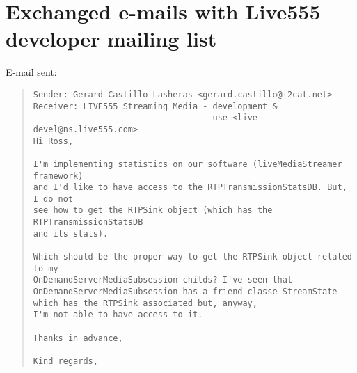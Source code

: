 \chapter{Exchanged e-mails with Live555 developer mailing list}\label{emailRoss}

E-mail sent:

\begin{quote}
\begin{verbatim}
Sender: Gerard Castillo Lasheras <gerard.castillo@i2cat.net>
Receiver: LIVE555 Streaming Media - development & 
									use <live-devel@ns.live555.com> 
Hi Ross,

I'm implementing statistics on our software (liveMediaStreamer framework) 
and I'd like to have access to the RTPTransmissionStatsDB. But, I do not
see how to get the RTPSink object (which has the RTPTransmissionStatsDB 
and its stats).

Which should be the proper way to get the RTPSink object related to my
OnDemandServerMediaSubsession childs? I've seen that 
OnDemandServerMediaSubsession has a friend classe StreamState 
which has the RTPSink associated but, anyway, 
I'm not able to have access to it.

Thanks in advance,

Kind regards,
\end{verbatim}
\end{quote} 

